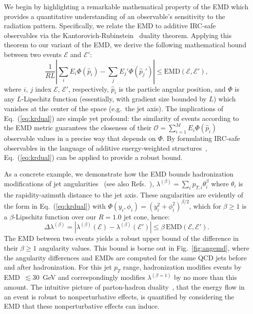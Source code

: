 \documentclass[aps,prl,twocolumn,preprintnumbers,nofootinbib,longbibliography,floatfix]{revtex4-1}
\DeclareRobustCommand{\Fig}[1]{Fig.~\ref{#1}}
\DeclareRobustCommand{\Eq}[1]{Eq.~(\ref{#1})}
\DeclareRobustCommand{\Refs}[1]{Refs.~\cite{#1}}
\begin{document}
We begin by highlighting a remarkable mathematical property of the EMD which provides a quantitative understanding of an observable's sensitivity to the radiation pattern.
%
Specifically, we relate the EMD to additive IRC-safe observables via the Kantorovich-Rubinstein~\cite{kantorovich1958space} duality theorem.
%
Applying this theorem to our variant of the EMD, we derive the following mathematical bound between two events $\mathcal E$ and $\mathcal E'$:
\begin{equation}
\frac{1}{RL}\left|\sum_{i} E_i \Phi(\hat p_i) - \sum_{j} E_j' \Phi(\hat p_j')\right| \le \text{EMD}(\mathcal E, \mathcal E'),
\label{eq:krdual}
\end{equation}
where $i,\,j$ index $\mathcal E,\,\mathcal E'$, respectively, $\hat p_i$ is the particle angular position, and $\Phi$ is any $L$-Lipschitz function (essentially, with gradient size bounded by $L$) which vanishes at the center of the space (e.g.\ the jet axis).
%
The implications of \Eq{eq:krdual} are simple yet profound: the similarity of events according to the EMD metric guarantees the closeness of their $\mathcal O = \sum_{i=1}^M E_i \Phi(\hat p_i)$ observable values in a precise way that depends on $\Phi$.
%
By formulating IRC-safe observables in the language of additive energy-weighted structures~\cite{Komiske:2017aww,Komiske:2018cqr}, \Eq{eq:krdual} can be applied to provide a robust bound.


As a concrete example, we demonstrate how the EMD bounds hadronization modifications of jet angularities~\cite{Larkoski:2014pca} (see also \Refs{Berger:2003iw,Almeida:2008yp,Ellis:2010rwa,Larkoski:2014uqa}), $\lambda^{(\beta)} = \sum_i p_{T,i} \theta_i^{\beta}$ where $\theta_i$ is the rapidity-azimuth distance to the jet axis.
%
These angularities are evidently of the form in \Eq{eq:krdual} with $\Phi(y_i,\phi_i) = (y_i^2 + \phi_i^2)^{\beta/2}$, which for $\beta\ge1$ is a $\beta$-Lipschitz function over our $R=1.0$ jet cone, hence:
\begin{equation}
\label{eq:dlam}
\Delta\lambda^{(\beta)} = |\lambda^{(\beta)}(\mathcal E) -  \lambda^{(\beta)}(\mathcal E')| \le \beta\, \text{EMD}(\mathcal E, \mathcal E').
\end{equation}
%
The EMD between two events yields a robust upper bound of the difference in their $\beta\ge 1$ angularity values.
%
This bound is borne out in \Fig{fig:angemd}, where the angularity differences and EMDs are computed for the same QCD jets before and after hadronization.
%
For this jet $p_T$ range, hadronization modifies events by EMD~$\lesssim 30$~GeV and correspondingly modifies $\lambda^{(\beta=1)}$ by no more than this amount.
%
The intuitive picture of parton-hadron duality~\cite{Dokshitzer:1991eq}, that the energy flow in an event is robust to nonperturbative effects, is quantified by considering the EMD that these nonperturbative effects can induce.
\end{document}
